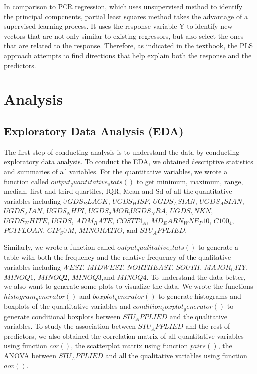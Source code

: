 \documentclass{article}
\begin{document}
In comparison to PCR regression, which uses unsupervised method to identify the principal components, partial least squares method takes the advantage of a supervised learning process. It uses the response variable Y to identify new vectors that are not only similar to existing regressors, but also select the ones that are related to the response. Therefore, as indicated in the textbook, the PLS approach attempts to find directions that help explain both the response and the predictors. 
\section{Analysis}

\subsection{Exploratory Data Analysis (EDA)}

The first step of conducting analysis is to understand the data by conducting exploratory data analysis. To conduct the EDA, we obtained descriptive statistics and summaries of all variables. For the quantitative variables, we wrote a function called $output_quantitative_stats()$ to get minimum, maximum, range, median, first and third quartiles, IQR, Mean and Sd of all the quantitative variables including $UGDS_BLACK$, $UGDS_HISP$, $UGDS_ASIAN$, $UGDS_ASIAN$, $UGDS_AIAN$, $UGDS_NHPI$, $UGDS_2MOR$,$UGDS_NRA$, $UGDS_UNKN$,$UGDS_WHITE$, $UGDS$, $ADM_RATE$, $COSTT4_A$, $MD_EARN_WNE_P10$, $C100_4$, $PCTFLOAN$, $CIP_SUM$, $MINORATIO$, and $STU_APPLIED$.

Similarly, we wrote a function called $output_qualitative_stats()$ to generate a table with both the frequency and the relative frequency of the qualitative variables including $WEST$, $MIDWEST$, $NORTHEAST$, $SOUTH$, $MAJOR_CITY$, $MINOQ1$, $MINOQ2$, $MINOQ3$,and $MINOQ4$. To understand the data better, we also want to generate some plots to visualize the data. We wrote the functions $histogram_generator()$ and $boxplot_generator()$ to generate histograms and boxplots of the quantitative variables and $condition_boxplot_generator()$ to generate conditional boxplots between $STU_APPLIED$ and the qualitative variables. To study the association between $STU_APPLIED$ and the rest of predictors, we also obtained the correlation matrix of all quantitative variables using function $cor()$, the scatterplot matrix using function $pairs()$, the ANOVA between $STU_APPLIED$ and all the qualitative variables using function $aov()$.
\end{document}
